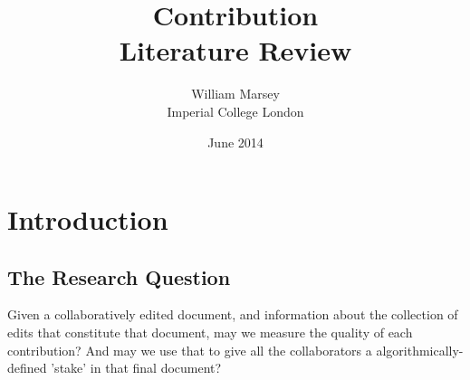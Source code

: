 \documentclass[a4paper,11pt,twoside,notitlepage]{article}
\renewenvironment{abstract}
 {
	\small
  	\begin{center}
  	\bfseries \abstractname\vspace{-.5em}\vspace{0pt}
  	\end{center}
  	\list{}{
    	\setlength{\leftmargin}{.5cm}%
    	\setlength{\rightmargin}{\leftmargin}%
  	}%
  	\item\relax}
 	{\endlist}
\begin{document}
	\title{Contribution
		\\ \small Literature Review}
	\author{William Marsey
		\\Imperial College London}
	\date{June 2014}
 	\maketitle
	

	

	

        \section{Introduction}
        \subsection{The Research Question}
        Given a collaboratively edited document, and information about
        the collection of edits that constitute that document, may we
        measure the quality of each contribution? And may we use that
        to give all the collaborators a algorithmically-defined 'stake'
        in that final document?
        
\end{document}
